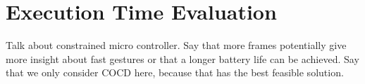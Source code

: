 \section{Execution Time Evaluation}
Talk about constrained micro controller.
Say that more frames potentially give more insight about fast gestures or that a longer battery life can be achieved.
Say that we only consider COCD here, because that has the best feasible solution.







